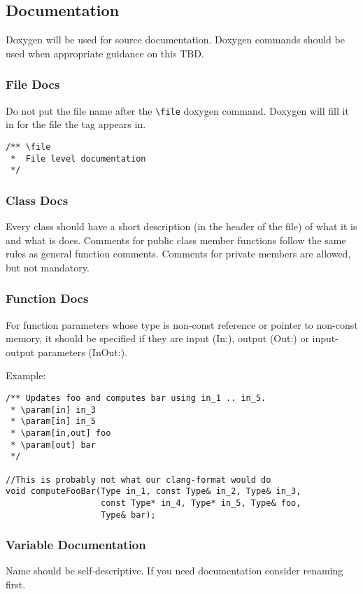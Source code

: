 \subsection{Documentation}
Doxygen will be used for source documentation. Doxygen commands should be used when appropriate guidance on this TBD.

\subsubsection{File Docs}
Do not put the file name after the \verb|\file| doxygen command. Doxygen will fill it in for the file the tag appears in.
\begin{lstlisting}
/** \file
 *  File level documentation 
 */
\end{lstlisting}

\subsubsection{Class Docs}
Every class should have a short description (in the header of the file) of what it is and what is does.
Comments for public class member functions follow the same rules as general function comments.
Comments for private members are allowed, but not mandatory.

\subsubsection{Function Docs}
For function parameters whose type is non-const reference or pointer to non-const memory,
it should be specified if they are input (In:), output (Out:) or input-output parameters (InOut:).

Example:
\begin{lstlisting}
/** Updates foo and computes bar using in_1 .. in_5.
 * \param[in] in_3
 * \param[in] in_5
 * \param[in,out] foo
 * \param[out] bar
 */

//This is probably not what our clang-format would do
void computeFooBar(Type in_1, const Type& in_2, Type& in_3,
                   const Type* in_4, Type* in_5, Type& foo,
                   Type& bar);
\end{lstlisting}

\subsubsection{Variable Documentation}
Name should be self-descriptive.  If you need documentation consider renaming first.

